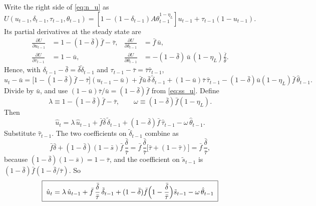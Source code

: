 \documentclass[authoryear, review, 12pt]{elsarticle}
\begin{document}
Write the right side of \eqref{eq:n_u} as
$U(u_{t-1},\delta_{t-1},\tau_{t-1},\theta_{t-1})
=[1-(1-\delta_{t-1})A\theta_{t-1}^{1-\eta_L}]u_{t-1}+\tau_{t-1}(1-u_{t-1})$. Its partial
derivatives at the steady state are
\begin{align*}
	\frac{\partial U}{\partial u_{t-1}}&=1-(1-\bar\delta)\bar f-\bar\tau,
	&\frac{\partial U}{\partial\delta_{t-1}}&=\bar f\,\bar u,\\
	\frac{\partial U}{\partial\tau_{t-1}}&=1-\bar u,
	&\frac{\partial U}{\partial\theta_{t-1}}&=-(1-\bar\delta)\,\bar u\,(1-\eta_L)\frac{\bar f}{\bar\theta}.
\end{align*}
Hence, with $\delta_{t-1}-\bar\delta=\bar\delta\tilde\delta_{t-1}$ and
$\tau_{t-1}-\bar\tau=\bar\tau\hat\tau_{t-1}$,
\[
	u_t-\bar u=\bigl[1-(1-\bar\delta)\bar f-\bar\tau\bigr](u_{t-1}-\bar u)
	+\bar f\bar u\,\bar\delta\,\tilde\delta_{t-1}+(1-\bar u)\bar\tau\,\hat\tau_{t-1}
	-(1-\bar\delta)\bar u(1-\eta_L)\bar f\,\hat\theta_{t-1}.
\]
Divide by $\bar u$, and use $(1-\bar u)\bar\tau/\bar u=(1-\bar\delta)\bar f$ from
\eqref{eq:ss_u}. Define
\[
	\lambda\equiv1-(1-\bar\delta)\bar f-\bar\tau,
	\qquad
	\omega\equiv(1-\bar\delta)\bar f(1-\eta_L).
\]
Then
\begin{equation}\label{eq:l_u_tau}
	\hat u_t=\lambda\,\hat u_{t-1}+\bar f\bar\delta\,\tilde\delta_{t-1}
	+(1-\bar\delta)\bar f\,\hat\tau_{t-1}-\omega\,\hat\theta_{t-1}.
\end{equation}
Substitute $\hat\tau_{t-1}$. The two coefficients on $\tilde\delta_{t-1}$ combine as
\[
	\bar f\bar\delta+(1-\bar\delta)(1-\bar s)\bar f\,\frac{\bar\delta}{\bar\tau}
	=\bar f\,\frac{\bar\delta}{\bar\tau}\bigl[\bar\tau+(1-\bar\tau)\bigr]
	=\bar f\,\frac{\bar\delta}{\bar\tau},
\]
because $(1-\bar\delta)(1-\bar s)=1-\bar\tau$, and the coefficient on $\tilde s_{t-1}$ is
$(1-\bar\delta)\bar f(1-\bar\delta/\bar\tau)$. So
\begin{equation}\label{eq:l_u}
	\boxed{\;\hat u_t=\lambda\,\hat u_{t-1}+\bar f\,\frac{\bar\delta}{\bar\tau}\,\tilde\delta_{t-1}
	+(1-\bar\delta)\bar f\Bigl(1-\frac{\bar\delta}{\bar\tau}\Bigr)\tilde s_{t-1}
	-\omega\,\hat\theta_{t-1}\;}
\end{equation}
\end{document}
